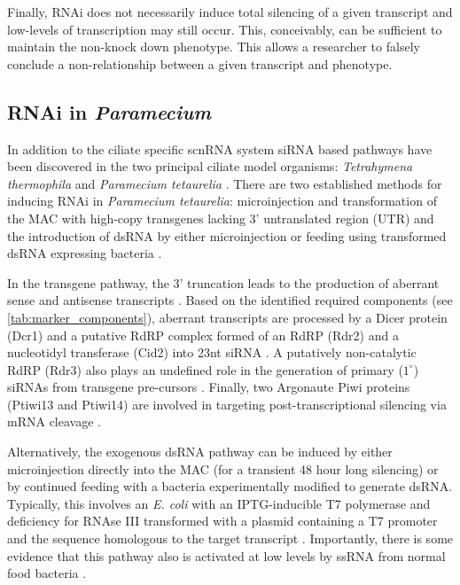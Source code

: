 Finally, RNAi does not necessarily induce total silencing
of a given transcript and low-levels of transcription may still occur.
This, conceivably, can be sufficient to maintain the non-knock down phenotype.
This allows a researcher to falsely conclude a non-relationship between
a given transcript and phenotype.

\subsection{RNAi in \textit{Paramecium}}

In addition to the ciliate specific scnRNA system 
siRNA based pathways have been discovered in the two principal
ciliate model organisms: \textit{Tetrahymena thermophila} \citep{Collins2006,Yao2005}
and \textit{Paramecium tetaurelia} \citep{Galvani2001,Galvani2002}. 
There are two established methods for inducing RNAi in \textit{Paramecium tetaurelia}:
microinjection and transformation of the MAC with high-copy transgenes lacking 3' untranslated
region (UTR) \citep{Galvani2001} and the introduction of dsRNA by either
microinjection or feeding using transformed dsRNA expressing bacteria 
\citep{Galvani2002}.

In the transgene pathway, the 3' truncation leads to the production of aberrant
sense and antisense transcripts \citep{Galvani2001,Marker2010,Beisson2010b}.
Based on the identified required components (see \cref{tab:marker_components}), 
aberrant transcripts
are processed by a Dicer protein (Dcr1) \citep{Lepere2009} and
a putative RdRP complex formed of an RdRP (Rdr2) and a nucleotidyl
transferase (Cid2) \citep{Marker2014} into 23nt siRNA \citep{Lepere2009}. 
A putatively non-catalytic 
RdRP (Rdr3) also plays an undefined role in the generation
of primary (\(1^{\circ}\)) siRNAs from transgene pre-cursors \citep{Marker2010,Marker2014}.
Finally, two Argonaute Piwi proteins (Ptiwi13 and Ptiwi14) \citep{Bouhouche2011} 
are involved in targeting post-transcriptional silencing via mRNA
cleavage \citep{Bouhouche2011,Marker2014}.


Alternatively, the exogenous dsRNA pathway can be induced by either microinjection directly
into the MAC (for a transient 48 hour long silencing) or by continued feeding
with a bacteria experimentally modified to generate dsRNA.
Typically, this involves an \textit{E. coli} 
with an IPTG-inducible T7 polymerase and 
deficiency for RNAse III transformed with
a plasmid containing a T7 promoter and the sequence
homologous to the target transcript
\citep{Fire1998,Timmons2001,Galvani2002}.
Importantly, there is some evidence that this pathway also is activated at low
levels by ssRNA from normal food bacteria \citep{Carradec2015}.

